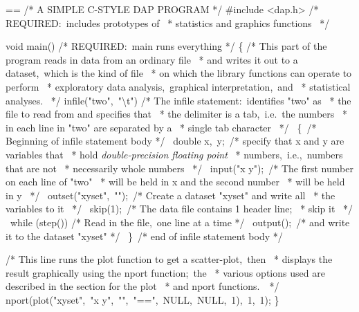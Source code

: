 \documentclass{book}
\makeatletter
\newenvironment{Texinfopreformatted}{%
  \par\GNUTobeylines\obeyspaces\frenchspacing\parskip=\z@\parindent=\z@}{}
{\catcode`\^^M=13 \gdef\GNUTobeylines{\catcode`\^^M=13 \def^^M{\null\par}}}
\newenvironment{Texinfoindented}{\begin{list}{}{}\item\relax}{\end{list}}
\renewcommand{\_}{\Texinfounderscore\discretionary{}{}{}}
\makeatother
\begin{document}
\begin{Texinfoindented}
\begin{Texinfopreformatted}%
\ttfamily /* A SIMPLE C-STYLE DAP PROGRAM */
\#include <dap.h>       /* REQUIRED:\ includes prototypes of
\                        * statistics and graphics functions
\                        */

void main()            /* REQUIRED:\ main runs everything */
\{
/* This part of the program reads in data from an ordinary file
\ * and writes it out to a dataset,\ which is the kind of file
\ * on which the library functions can operate to perform
\ * exploratory data analysis,\ graphical interpretation,\ and
\ * statistical analyses.
\ */
infile("two",\ "\textbackslash{}t")    /* The infile statement:\ identifies "two" as
\                        * the file to read from and specifies that
\                        * the delimiter is a tab,\ i.e.\ the numbers
\                        * in each line in "two" are separated by a
\                        * single tab character
\                        */
\  \{\                    /* Beginning of infile statement body */
\  double x,\ y;\         /* specify that x and y are variables that
\                        * hold \textsl{double-precision floating point}
\                        * numbers,\ i.e.,\ numbers that are not
\                        * necessarily whole numbers
\                        */
\  input("x y");\        /* The first number on each line of "two"
\                        * will be held in x and the second number
\                        * will be held in y
\                        */
\  outset("xyset",\ "");\ /* Create a dataset "xyset" and write all
\                        * the variables to it
\                        */
\  skip(1);\             /* The data file contains 1 header line;
\                        * skip it
\                        */
\  while (step())       /* Read in the file,\ one line at a time */
\    output();\          /* and write it to the dataset "xyset" */
\  \}\                    /* end of infile statement body */

/* This line runs the plot function to get a scatter-plot,\ then
\ * displays the result graphically using the nport function;\ the
\ * various options used are described in the section for the plot
\ * and nport functions.\  
\ */
nport(plot("xyset",\ "x y",\ "",\ "==",\ NULL,\ NULL,\ 1),\ 1,\ 1);
\}
\end{Texinfopreformatted}
\end{Texinfoindented}
\end{document}
